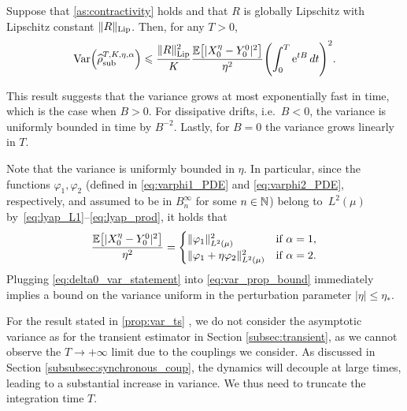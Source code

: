 \begin{proposition}
	\label{prop:var_ts}
	Suppose that \cref{as:contractivity} holds and that $R$ is globally Lipschitz with Lipschitz constant $\|R\|_{\rm Lip}$. Then, for any $T>0$,
	\begin{equation}
		\Var\paren*{\aTSest} \leq \frac{\RLip^2}{K}\frac{\E\bkt*{|X_0^\eta - Y_0^0|^2}}{\eta^2}\paren*{\int_0^T \e^{tB} \, dt}^2.
	\label{eq:var_prop_bound}
	\end{equation}
\end{proposition}
%
This result suggests that the variance grows at most exponentially fast in time, which is the case when $B>0$. For dissipative drifts, i.e.\ $B<0$, the variance is uniformly bounded in time by $B^{-2}$. Lastly, for $B=0$ the variance grows linearly in $T$.

Note that the variance is uniformly bounded in $\eta$. In particular, since the functions $\varphi_1,\varphi_2$ (defined in \eqref{eq:varphi1_PDE} and \eqref{eq:varphi2_PDE}, respectively, and assumed to be in $B^\infty_n$ for some $n\in\mathbb{N}$) belong to~$L^2(\mu)$ by~\eqref{eq:lyap_L1}--\eqref{eq:lyap_prod}, it holds that
%
\begin{equation}
	\frac{\E\bkt*{\abs{X_0^\eta - Y_0^0}^2}}{\eta^2} = 
	\begin{cases}
		\norm{\varphi_1}^2_{L^2(\mu)} &\text{if }\alpha = 1, \\
		\norm{\varphi_1 + \eta\varphi_2}^2_{L^2(\mu)} &\text{if }\alpha = 2.
	\end{cases}
	\label{eq:delta0_var_statement}
\end{equation}
%
%
Plugging \eqref{eq:delta0_var_statement} into \eqref{eq:var_prop_bound} immediately implies a bound on the variance uniform in the perturbation parameter $|\eta| \leq \eta_*$.

For the result stated in \cref{prop:var_ts} , we do not consider the asymptotic variance as for the transient estimator in Section \ref{subsec:transient}, as we cannot observe the $T\to+\infty$ limit due to the couplings we consider. As discussed in Section \ref{subsubsec:synchronous_coup}, the dynamics will decouple at large times, leading to a substantial increase in variance. We thus need to truncate the integration time $T$.
%

